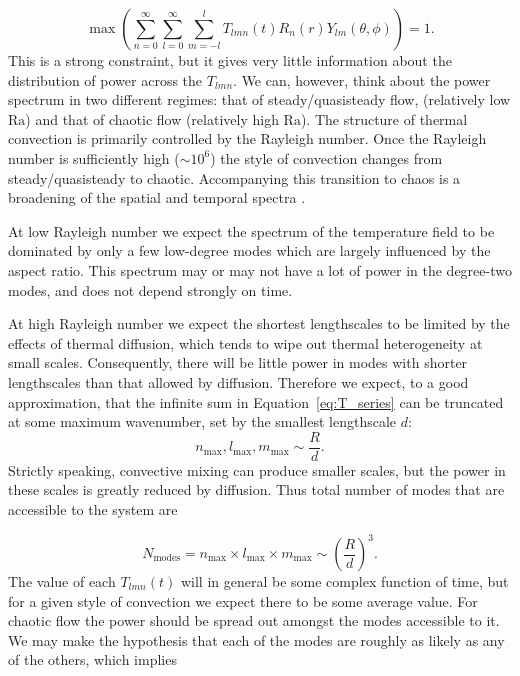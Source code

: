 \documentclass[preprint,12pt,authoryear]{elsarticle}
\begin{document}
\begin{equation}
\max \left( \displaystyle \sum_{n=0}^\infty \sum_{l=0}^\infty \sum_{m=-l}^{l} T_{lmn}(t) R_n(r) Y_{lm} (\theta , \phi) \right) = 1.
\end{equation}
This is a strong constraint, but it gives very little information about the distribution of power across the $T_{lmn}$.  
We can, however, think about the power spectrum in two different regimes: that of steady/quasisteady flow, (relatively low $\mathrm{Ra}$) 
and that of chaotic flow (relatively high $\mathrm{Ra}$).
The structure of thermal convection is primarily controlled by the Rayleigh number.  Once the Rayleigh number is sufficiently high ($\sim10^6$) 
the style of convection changes from steady/quasisteady to chaotic.  Accompanying this transition to chaos is a broadening of the spatial 
and temporal spectra \citep{mclaughlin1982transition}.  

At low Rayleigh number we expect the spectrum of the temperature field to be dominated by only a few low-degree modes which are largely influenced by the aspect ratio.
This spectrum may or may not have a lot of power in the degree-two modes, and does not depend strongly on time.

At high Rayleigh number we expect the shortest lengthscales to be limited by the effects of thermal diffusion,
which tends to wipe out thermal heterogeneity at small scales.  Consequently, there will be little power in modes
with shorter lengthscales than that allowed by diffusion. 
Therefore we expect, to a good approximation, that the infinite sum in Equation~\eqref{eq:T_series} can be truncated at some maximum wavenumber, set by the smallest lengthscale $d$:
\begin{equation}
n_{\text{max}}, l_{\text{max}}, m_{\text{max}} \sim \frac{R}{d}.
\label{eq:max_wavenumber}
\end{equation}
Strictly speaking, convective mixing can produce smaller scales, but the power in these scales
is greatly reduced by diffusion.
Thus total number of modes that are accessible to the system are 

\begin{equation}
N_{\text{modes}} = n_{\text{max}} \times l_{\text{max}} \times m_{\text{max}} \sim \left( \frac{R}{d} \right)^{3}.
\end{equation}
The value of each $T_{lmn}(t)$ will in general be some complex function of time, but for a given style of convection we expect there to be some average value.
For chaotic flow the power should be spread out amongst the modes accessible to it.
We may make the hypothesis that each of the modes are roughly as likely as any of the others, which implies
\end{document}
